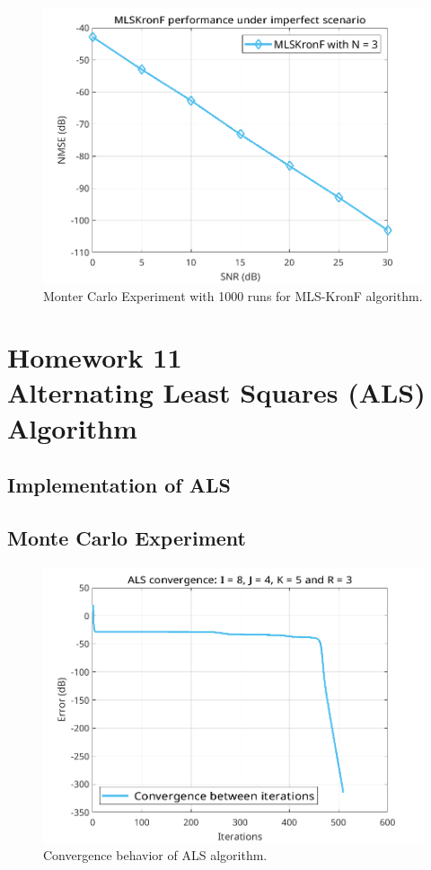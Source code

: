 \documentclass[a4paper,10pt]{article}
\begin{document}
    \begin{figure}[ht!]
        \centering 
        \includegraphics[width=0.75\linewidth]{figs/hw10.png} \par 
        \caption{Monter Carlo Experiment with 1000 runs for MLS-KronF algorithm.}
        \label{fig:hw10} 
    \end{figure}

\newpage
\section*{Homework 11 \\ Alternating Least Squares (ALS) Algorithm}

    \subsection*{Implementation of ALS}

    \subsection*{Monte Carlo Experiment}

    \begin{figure}[ht!]
        \centering 
        \includegraphics[width=0.75\linewidth]{figs/hw11a1.png} \par 
        \caption{Convergence behavior of ALS algorithm.}
        \label{fig:hw11a1} 
    \end{figure}
\end{document}
